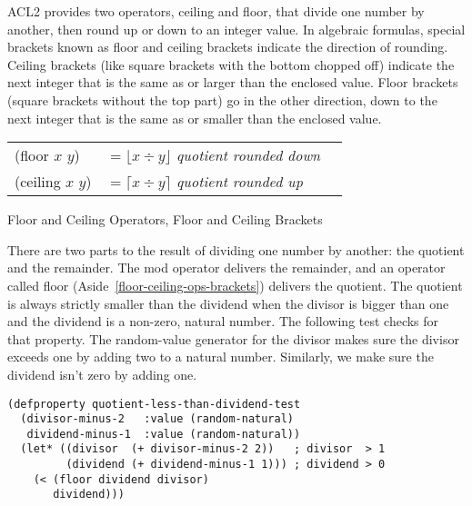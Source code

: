 \begin{aside}
ACL2 provides two operators,
\textsf{ceiling} and \textsf{floor}, that divide one number by another,
then round up or down to an integer value.
In algebraic formulas, special brackets known as
floor and ceiling brackets indicate the direction of rounding.
Ceiling brackets (like square brackets with the bottom chopped off)
indicate the next integer that is the same as or larger than
the enclosed value.
Floor brackets (square brackets without the top part)
go in the other direction, down to the next integer
that is the same as or smaller than the enclosed value.
\vspace{2mm}
\begin{center}
\begin{tabular}{lll}
\textsf{(floor $x$ $y$)}  & $= \lfloor x \div y \rfloor$ \emph{quotient rounded down} \vspace{1mm}\\
\textsf{(ceiling $x$ $y$)}& $= \lceil x  \div y \rceil $ \emph{quotient rounded up}   \\
\end{tabular}
\end{center}
\caption{Floor and Ceiling Operators, Floor and Ceiling Brackets}
\label{floor-def}
\label{ceiling-def}
\label{floor-ceiling-ops-brackets}
\end{aside}

There are two parts to the result
of dividing one number by another: the quotient and the remainder.
The \textsf{mod} operator delivers the remainder,
and an operator called \textsf{floor} (Aside~\ref{floor-ceiling-ops-brackets})
delivers the quotient.
The quotient is always strictly smaller
than the dividend when the divisor is bigger than one
and the dividend is a non-zero, natural number.
The following test checks for that property.
The random-value generator for the divisor
makes sure the divisor exceeds one by adding two
to a natural number.
Similarly, we make sure the dividend isn't zero by adding one.

\label{quotient-less-than-dividend-test}\begin{Verbatim}
(defproperty quotient-less-than-dividend-test
  (divisor-minus-2   :value (random-natural)
   dividend-minus-1  :value (random-natural))
  (let* ((divisor  (+ divisor-minus-2 2))   ; divisor  > 1
         (dividend (+ dividend-minus-1 1))) ; dividend > 0
    (< (floor dividend divisor)
       dividend)))
\end{Verbatim}

